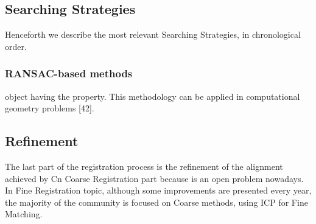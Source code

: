 \subsection{Searching Strategies}

Henceforth we describe the most relevant Searching Strategies, in chronological order.

\subsubsection{RANSAC-based methods}
 
object having the property. This methodology can be applied in computational geometry problems
[42].

\subsection{Refinement}
The last part of the registration process is the refinement of the alignment achieved by Cn Coarse Registration part because is an open problem
nowadays. In Fine Registration topic, although some improvements are presented every year, the
majority of the community is focused on Coarse methods, using ICP for Fine Matching.
